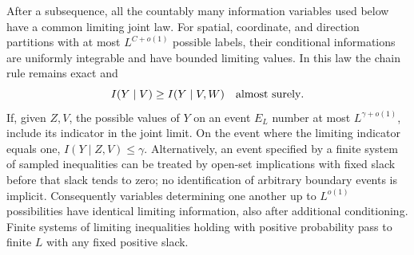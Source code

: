 \begin{lemma}
\label{lem:transverse-information}
After a subsequence, all the countably many information variables used
below have a common limiting joint law.  For spatial, coordinate, and
direction partitions with at most $L^{C+o(1)}$ possible labels,
their conditional informations are uniformly integrable and have
bounded limiting values.  In this law the chain rule remains exact and
\begin{equation}\label{eq:transverse-conditioning}
 I(Y\mid V)\ge I(Y\mid V,W)\quad\hbox{almost surely}.
\end{equation}
If, given $Z,V$, the possible values of $Y$ on an event $E_L$
number at most $L^{\gamma+o(1)}$, include its indicator in the
joint limit.  On the event where the limiting indicator equals one,
$I(Y\mid Z,V)\le\gamma$.  Alternatively, an event specified by
a finite system of sampled inequalities can be treated by open-set
implications with fixed slack before that slack tends to zero; no
identification of arbitrary boundary events is implicit.  Consequently
variables determining one
another up to $L^{o(1)}$ possibilities have identical limiting
information, also after additional conditioning.  Finite systems of
limiting inequalities holding with positive probability pass to
finite $L$ with any fixed positive slack.
\end{lemma}

